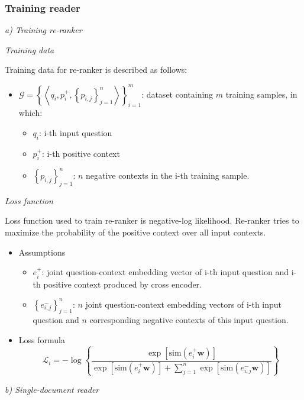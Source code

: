 \documentclass[12pt, sort&compress]{report}
\begin{document}
\subsubsection{Training reader}
\label{sec:3.2.2.2}
\par \textit{a) Training re-ranker}
\par \textit{Training data}
\par Training data for re-ranker is described as follows:
\begin{itemize}
	\item 
	$\mathcal{G} = \left\{\left\langle q_i, p_i^+, \left\{p_{i, j}\right\}_{j=1}^n\right\rangle\right\}_{i=1}^m$: dataset containing $m$ training samples, in which:
	\begin{itemize}
		\item $q_i$: i-th input question
		\item $p_i^+$: i-th positive context
		\item $\left\{p_{i,j}\right\}_{j=1}^n$: $n$ negative contexts in the i-th training sample.
	\end{itemize}
\end{itemize}
\par \textit{Loss function}
\par Loss function used to train re-ranker is negative-log likelihood. Re-ranker tries to maximize the probability of the positive context over all input contexts. 
\begin{itemize}
	\item Assumptions
	\begin{itemize}
		\item $e_i^+$: joint question-context embedding vector of i-th input question and i-th positive context produced by cross encoder.
		\item $\left\{e_{i, j}^-\right\}_{j=1}^n$: $n$ joint question-context embedding vectors of i-th input question and $n$ corresponding negative contexts of this input question. 
	\end{itemize}
	\item Loss formula \\[10pt]
	\begin{equation}
		\label{eq:04}
		\mathcal{L}_i =-\log\left\{ \dfrac{\exp\left[\text{sim}\left(e^+_i\mathbf{w}\right)\right]}{\exp\left[\text{sim}\left(e^+_i\mathbf{w}\right)\right] + \sum\limits_{j=1}^n\exp\left[\text{sim}\left(e^-_{i,j}\mathbf{w}\right)\right]}\right\}
	\end{equation}
\end{itemize}
\par \textit{b) Single-document reader}
\end{document}
